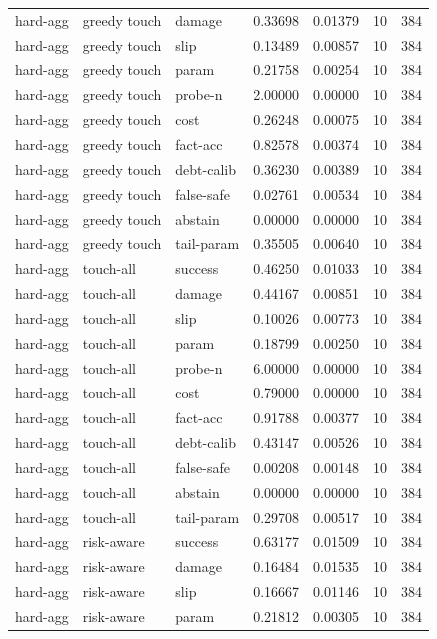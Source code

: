 \documentclass{article}
\begin{document}
\begin{center}
\begin{longtable}{lllllll}
hard-agg & greedy touch & damage & 0.33698 & 0.01379 & 10 & 384 \\
hard-agg & greedy touch & slip & 0.13489 & 0.00857 & 10 & 384 \\
hard-agg & greedy touch & param & 0.21758 & 0.00254 & 10 & 384 \\
hard-agg & greedy touch & probe-n & 2.00000 & 0.00000 & 10 & 384 \\
hard-agg & greedy touch & cost & 0.26248 & 0.00075 & 10 & 384 \\
hard-agg & greedy touch & fact-acc & 0.82578 & 0.00374 & 10 & 384 \\
hard-agg & greedy touch & debt-calib & 0.36230 & 0.00389 & 10 & 384 \\
hard-agg & greedy touch & false-safe & 0.02761 & 0.00534 & 10 & 384 \\
hard-agg & greedy touch & abstain & 0.00000 & 0.00000 & 10 & 384 \\
hard-agg & greedy touch & tail-param & 0.35505 & 0.00640 & 10 & 384 \\
hard-agg & touch-all & success & 0.46250 & 0.01033 & 10 & 384 \\
hard-agg & touch-all & damage & 0.44167 & 0.00851 & 10 & 384 \\
hard-agg & touch-all & slip & 0.10026 & 0.00773 & 10 & 384 \\
hard-agg & touch-all & param & 0.18799 & 0.00250 & 10 & 384 \\
hard-agg & touch-all & probe-n & 6.00000 & 0.00000 & 10 & 384 \\
hard-agg & touch-all & cost & 0.79000 & 0.00000 & 10 & 384 \\
hard-agg & touch-all & fact-acc & 0.91788 & 0.00377 & 10 & 384 \\
hard-agg & touch-all & debt-calib & 0.43147 & 0.00526 & 10 & 384 \\
hard-agg & touch-all & false-safe & 0.00208 & 0.00148 & 10 & 384 \\
hard-agg & touch-all & abstain & 0.00000 & 0.00000 & 10 & 384 \\
hard-agg & touch-all & tail-param & 0.29708 & 0.00517 & 10 & 384 \\
hard-agg & risk-aware & success & 0.63177 & 0.01509 & 10 & 384 \\
hard-agg & risk-aware & damage & 0.16484 & 0.01535 & 10 & 384 \\
hard-agg & risk-aware & slip & 0.16667 & 0.01146 & 10 & 384 \\
hard-agg & risk-aware & param & 0.21812 & 0.00305 & 10 & 384 \\

\end{longtable}
\end{center}
\end{document}
